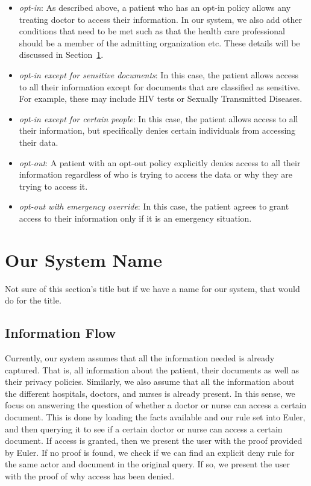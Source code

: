 \documentclass[conference]{IEEEtran}
\begin{document}
\begin{itemize}
 \item \textit{opt-in}: As described above, a patient who has an opt-in policy allows any treating doctor to access their information. In our system, we also
add other conditions that need to be met such as that the health care professional should be a member of the admitting organization etc. These details will be
discussed in Section~\ref{main-sys}.
\item \textit{opt-in except for sensitive documents}: In this case, the patient allows access to all their information except for documents that are classified
as sensitive. For example, these may include HIV tests or Sexually Transmitted Diseases. 
\item \textit{opt-in except for certain people}: In this case, the patient allows access to all their information, but specifically denies certain individuals
from accessing their data.
\item \textit{opt-out}: A patient with an opt-out policy explicitly denies access to all their information regardless of who is trying to access the data or
why they are trying to access it.
\item \textit{opt-out with emergency override}: In this case, the patient agrees to grant access to their information only if it is an emergency situation. 
\end{itemize}

\section{Our System Name}
\label{main-sys}

Not sure of this section's title but if we have a name for our system, that would do for the title. 

\subsection{Information Flow}
\label{info-flow}

Currently, our system assumes that all the information needed is already captured. That is, all information about the patient, their documents as well as their
privacy policies. Similarly, we also assume that all the information about the different hospitals, doctors, and nurses is already present. In this sense, we
focus on answering the question of whether a doctor or nurse can access a certain document. This is done by loading the facts available and our rule set into
Euler, and then querying it to see if a certain doctor or nurse can access a certain document. If access is granted, then we present the user with the proof
provided by Euler. If no proof is found, we check if we can find an explicit deny rule for the same actor and document in the original query. If so, we present
the user
with the proof of why access has been denied.
\end{document}
